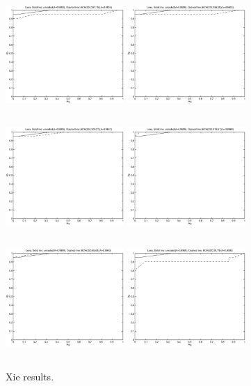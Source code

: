 \documentclass[12pt]{article}
\begin{document}
\begin{figure}[p]
	\includegraphics[height=4.5cm,width=4.5cm]{xieplot4.eps}
	\includegraphics[height=4.5cm,width=4.5cm]{xieplot6.eps}
	\includegraphics[height=4.5cm,width=4.5cm]{xieplot8.eps}
	\includegraphics[height=4.5cm,width=4.5cm]{xieplot10.eps}
	\includegraphics[height=4.5cm,width=4.5cm]{xieplot12.eps}
	\includegraphics[height=4.5cm,width=4.5cm]{xieplot14.eps}
	\caption{Xie results.}
\end{figure}
\end{document}
